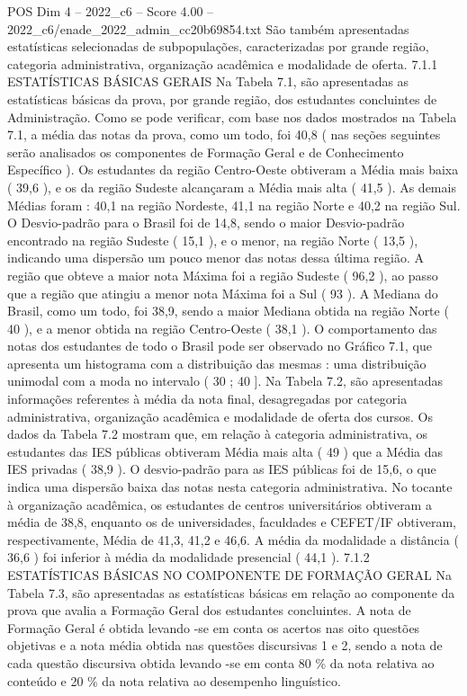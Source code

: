 \begin{textsample}{POS Dim 4 – 2022\_c6 – Score 4.00 – 2022\_c6/enade\_2022\_admin\_cc20b69854.txt}
São também apresentadas estatísticas selecionadas de subpopulações, caracterizadas por grande região, categoria administrativa, organização acadêmica e modalidade de oferta. 7.1.1 ESTATÍSTICAS BÁSICAS GERAIS Na Tabela 7.1, são apresentadas as estatísticas básicas da prova, por grande região, dos estudantes concluintes de Administração.
Como se pode verificar, com base nos dados mostrados na Tabela 7.1, a média das notas da prova, como um todo, foi 40,8 ( nas seções seguintes serão analisados os componentes de Formação Geral e de Conhecimento Específico ).
Os estudantes da região Centro-Oeste obtiveram a Média mais baixa ( 39,6 ), e os da região Sudeste alcançaram a Média mais alta ( 41,5 ).
As demais Médias foram : 40,1 na região Nordeste, 41,1 na região Norte e 40,2 na região Sul.
O Desvio-padrão para o Brasil foi de 14,8, sendo o maior Desvio-padrão encontrado na região Sudeste ( 15,1 ), e o menor, na região Norte ( 13,5 ), indicando uma dispersão um pouco menor das notas dessa última região.
A região que obteve a maior nota Máxima foi a região Sudeste ( 96,2 ), ao passo que a região que atingiu a menor nota Máxima foi a Sul ( 93 ).
A Mediana do Brasil, como um todo, foi 38,9, sendo a maior Mediana obtida na região Norte ( 40 ), e a menor obtida na região Centro-Oeste ( 38,1 ).
O comportamento das notas dos estudantes de todo o Brasil pode ser observado no Gráfico 7.1, que apresenta um histograma com a distribuição das mesmas : uma distribuição unimodal com a moda no intervalo ( 30 ; 40 ].
Na Tabela 7.2, são apresentadas informações referentes à média da nota final, desagregadas por categoria administrativa, organização acadêmica e modalidade de oferta dos cursos.
Os dados da Tabela 7.2 mostram que, em relação à categoria administrativa, os estudantes das IES públicas obtiveram Média mais alta ( 49 ) que a Média das IES privadas ( 38,9 ).
O desvio-padrão para as IES públicas foi de 15,6, o que indica uma dispersão baixa das notas nesta categoria administrativa.
No tocante à organização acadêmica, os estudantes de centros universitários obtiveram a média de 38,8, enquanto os de universidades, faculdades e CEFET/IF obtiveram, respectivamente, Média de 41,3, 41,2 e 46,6.
A média da modalidade a distância ( 36,6 ) foi inferior à média da modalidade presencial ( 44,1 ). 7.1.2 ESTATÍSTICAS BÁSICAS NO COMPONENTE DE FORMAÇÃO GERAL Na Tabela 7.3, são apresentadas as estatísticas básicas em relação ao componente da prova que avalia a Formação Geral dos estudantes concluintes.
A nota de Formação Geral é obtida levando -se em conta os acertos nas oito questões objetivas e a nota média obtida nas questões discursivas 1 e 2, sendo a nota de cada questão discursiva obtida levando -se em conta 80 \% da nota relativa ao conteúdo e 20 \% da nota relativa ao desempenho linguístico.

\end{textsample}
